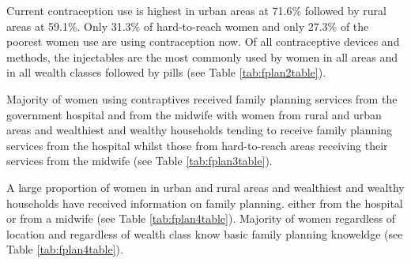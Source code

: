 \documentclass[12pt,a4paper]{article}
\begin{document}
Current contraception use is highest in urban areas at 71.6\% followed by rural areas at 59.1\%. Only 31.3\% of hard-to-reach women and only 27.3\% of the poorest women use are using contraception now. Of all contraceptive devices and methods, the injectables are the most commonly used by women in all areas and in all wealth classes followed by pills (see Table \ref{tab:fplan2table}).

Majority of women using contraptives received family planning services from the government hospital and from the midwife with women from rural and urban areas and wealthiest and wealthy households tending to receive family planning services from the hospital whilst those from hard-to-reach areas receiving their services from the midwife (see Table \ref{tab:fplan3table}).

A large proportion of women in urban and rural areas and wealthiest and wealthy households have received information on family planning. either from the hospital or from a midwife (see Table \ref{tab:fplan4table}). Majority of women regardless of location and regardless of wealth class know basic family planning knoweldge (see Table \ref{tab:fplan4table}).
\end{document}
